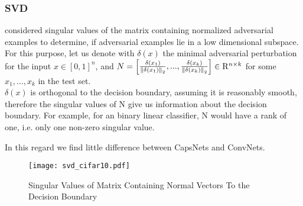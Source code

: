 \subsubsection{SVD}

\citet{universal} considered singular values of the matrix containing normalized adversarial examples to determine, if adversarial examples lie in a low dimensional subspace. \\
For this purpose, let us denote with $\delta(x)$ the minimal adversarial perturbation for the input $x \in [0,1]^n$,
and $ N = \begin{bmatrix}
\frac{\delta(x_1)} {\left \lVert \delta(x_1) \right \rVert _2},  ...,  \frac{\delta(x_k)} {\left \lVert \delta(x_k) \right \rVert _2} 
\end{bmatrix}
\in \mathrm{R}^{n \times k}
$ for some $x_1, ..., x_k$ in the test set. \\
$\delta(x)$ is orthogonal to the decision boundary, assuming it is reasonably smooth, therefore the singular values of N give us information about the decision boundary. For example, for an binary linear classifier, N would have a rank of one, i.e. only one non-zero singular value.

In this regard we find little difference between CapsNets and ConvNets.

\begin{figure}
	\caption{Singular Values of Matrix Containing Normal Vectors To the Decision Boundary}
	\texttt{[image: svd\_cifar10.pdf]}
	\label{fig:svd}
\end{figure}